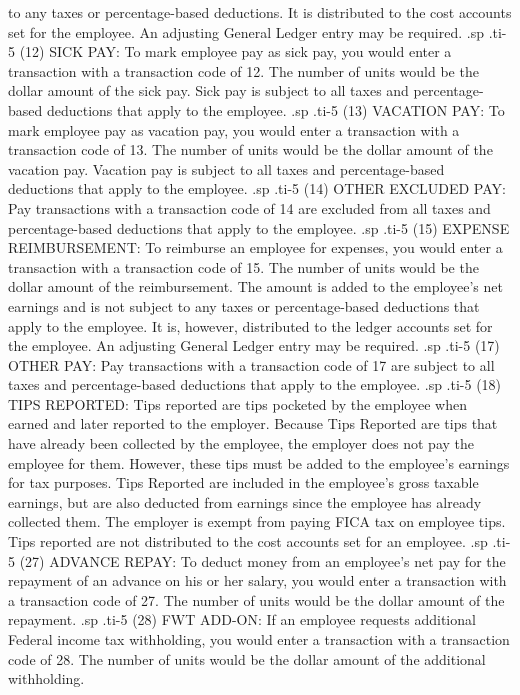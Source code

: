 to any taxes or percentage-based deductions. It is distributed to the
cost accounts set for the employee.  An adjusting General Ledger entry may
be required.
.sp
.ti-5
(12) SICK PAY: To mark employee pay as sick pay, you would enter a transaction
with a transaction code of 12.	The number of units would be the dollar
amount of the sick pay.  Sick pay is subject to all taxes and
percentage-based
deductions that apply to the employee.
.sp
.ti-5
(13) VACATION PAY: To mark employee pay as vacation pay, you would enter
a transaction with a transaction code of 13.  The number of units
would be the dollar amount of the vacation pay.  Vacation pay is
subject to all taxes and percentage-based deductions that apply to the
employee.
.sp
.ti-5
(14) OTHER EXCLUDED PAY: Pay transactions with a transaction code of 14
are excluded from all taxes and percentage-based
deductions that apply to the employee.
.sp
.ti-5
(15) EXPENSE REIMBURSEMENT: To reimburse an employee for expenses, you
would enter a transaction with a transaction code of 15.  The number
of units would be the dollar amount of the reimbursement.  The amount
is added to the employee's net earnings and is not subject to any taxes
or percentage-based
deductions that apply to the employee. It is, however, distributed to the
ledger accounts set for the employee.  An adjusting General Ledger entry
may be required.
.sp
.ti-5
(17) OTHER PAY: Pay transactions with a transaction code of 17 are subject
to all taxes and percentage-based deductions that apply to the employee.
.sp
.ti-5
(18) TIPS REPORTED: Tips reported are tips pocketed by the employee
when earned and later
reported to the employer.  Because Tips Reported are tips that have already
been collected by the employee, the employer does not pay the employee
for them.  However, these tips must be added to the employee's earnings
for tax purposes.  Tips Reported are included in the employee's gross taxable
earnings, but are also deducted from earnings since
the employee has already collected them.  The employer is exempt from
paying FICA tax on employee tips. Tips reported are not distributed to the
cost accounts set for an employee.
.sp
.ti-5
(27) ADVANCE REPAY: To deduct money from an employee's net pay for
the repayment of an advance on his or her salary, you would enter a
transaction with a transaction code of 27.  The number of units would
be the dollar amount of the repayment.
.sp
.ti-5
(28) FWT ADD-ON: If an employee requests additional Federal income tax
withholding,
you would enter a transaction with a transaction code of 28.  The number
of units would be the dollar amount of the additional withholding.
